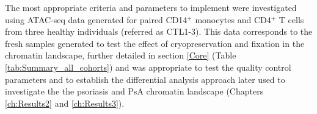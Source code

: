The most appropriate criteria and parameters to implement were investigated using ATAC-seq data generated for paired CD14$^+$ monocytes and CD4$^+$ T cells from three healthy individuals (referred as CTL1-3). This data corresponds to the fresh samples generated to test the effect of cryopreservation and fixation in the chromatin landscape, further detailed in section \ref{Core} (Table \ref{tab:Summary_all_cohorts}) and was appropriate to test the quality control parameters and to establish the differential analysis approach later used to investigate the the psoriasis and PsA chromatin landscape (Chapters \ref{ch:Results2} and \ref{ch:Results3}). 




